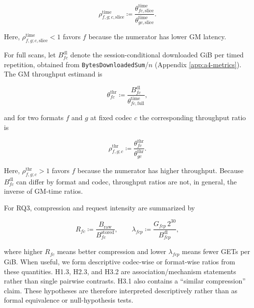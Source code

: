 \documentclass[nomenclature, english, bibtex]{kththesis}
\numberwithin{listing}{chapter}
\begin{document}
\[
\rho^{\mathrm{time}}_{f,g;c,\text{slice}} \coloneqq
\frac{\theta^{\mathrm{time}}_{fc,\text{slice}}}{\theta^{\mathrm{time}}_{gc,\text{slice}}}.
\]

Here, $\rho^{\mathrm{time}}_{f,g;c,\text{slice}}<1$ favors $f$ because the numerator has lower \gls{GM} latency.

For full scans, let $B^{\mathrm{dl}}_{fc}$ denote the session-conditional downloaded GiB per timed repetition, obtained from \texttt{BytesDownloadedSum}/$n$ (Appendix \ref{app:a4-metrics}). The \gls{GM} throughput estimand is

\[
\theta^{\mathrm{thr}}_{fc} \coloneqq
\frac{B^{\mathrm{dl}}_{fc}}{\theta^{\mathrm{time}}_{fc,\text{full}}},
\]

and for two formats $f$ and $g$ at fixed codec $c$ the corresponding throughput ratio is

\[
\rho^{\mathrm{thr}}_{f,g;c} \coloneqq
\frac{\theta^{\mathrm{thr}}_{fc}}{\theta^{\mathrm{thr}}_{gc}}.
\]

Here, $\rho^{\mathrm{thr}}_{f,g;c}>1$ favors $f$ because the numerator has higher throughput. Because $B^{\mathrm{dl}}_{fc}$ can differ by format and codec, throughput ratios are not, in general, the inverse of \gls{GM}-time ratios.

For RQ3, compression and request intensity are summarized by

\[
R_{fc} \coloneqq \frac{B_{\text{raw}}}{B^{\text{stored}}_{fc}},
\qquad
\lambda_{fcp} \coloneqq \frac{G_{fcp}\,2^{30}}{B_{fcp}^{\mathrm{dl}}},
\]

where higher $R_{fc}$ means better compression and lower $\lambda_{fcp}$ means fewer GETs per GiB. When useful, we form descriptive codec-wise or format-wise ratios from these quantities. H1.3, H2.3, and H3.2 are association/mechanism statements rather than single pairwise contrasts. H3.1 also contains a “similar compression” claim. These hypotheses are therefore interpreted descriptively rather than as formal equivalence or null-hypothesis tests.
\end{document}
